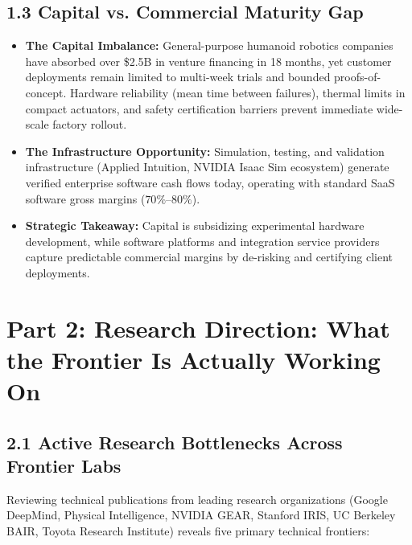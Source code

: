 \documentclass[11pt,a4paper]{article}
\begin{document}
\subsection{1.3 Capital vs. Commercial Maturity Gap}
\begin{itemize}
    \item \textbf{The Capital Imbalance:} General-purpose humanoid robotics companies have absorbed over \$2.5B in venture financing in 18 months, yet customer deployments remain limited to multi-week trials and bounded proofs-of-concept. Hardware reliability (mean time between failures), thermal limits in compact actuators, and safety certification barriers prevent immediate wide-scale factory rollout.
    \item \textbf{The Infrastructure Opportunity:} Simulation, testing, and validation infrastructure (Applied Intuition, NVIDIA Isaac Sim ecosystem) generate verified enterprise software cash flows today, operating with standard SaaS software gross margins ($70\%\text{--}80\%$).
    \item \textbf{Strategic Takeaway:} Capital is subsidizing experimental hardware development, while software platforms and integration service providers capture predictable commercial margins by de-risking and certifying client deployments.
\end{itemize}

\section{Part 2: Research Direction: What the Frontier Is Actually Working On}

\subsection{2.1 Active Research Bottlenecks Across Frontier Labs}
Reviewing technical publications from leading research organizations (Google DeepMind, Physical Intelligence, NVIDIA GEAR, Stanford IRIS, UC Berkeley BAIR, Toyota Research Institute) reveals five primary technical frontiers:
\end{document}
